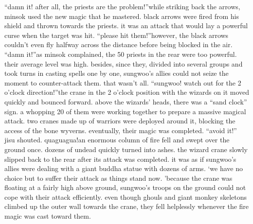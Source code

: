 “damn it! after all, the priests are the problem!”while striking back the arrows, minsok used the new magic that he mastered.
 black arrows were fired from his shield and thrown towards the priests.
 it was an attack that would lay a powerful curse when the target was hit.
“please hit them!”however, the black arrows couldn’t even fly halfway across the distance before being blocked in the air.
“damn it!”as minsok complained, the 50 priests in the rear were too powerful.
 their average level was high.
 besides, since they, divided into several groups and took turns in casting spells one by one, sungwoo’s allies could not seize the moment to counter-attack them.
that wasn’t all.
“sungwoo! watch out for the 2 o’clock direction!”the crane in the 2 o’clock position with the wizards on it moved quickly and bounced forward.
 above the wizards’ heads, there was a “sand clock” sign.
 a whopping 20 of them were working together to prepare a massive magical attack.
two cranes made up of warriors were deployed around it, blocking the access of the bone wyverns.
 eventually, their magic was completed.
“avoid it!” jisu shouted.
quaguagua!an enormous column of fire fell and swept over the ground once.
 dozens of undead quickly turned into ashes.
the wizard crane slowly slipped back to the rear after its attack was completed.
it was as if sungwoo’s allies were dealing with a giant buddha statue with dozens of arms.
‘we have no choice but to suffer their attack as things stand now.
’because the crane was floating at a fairly high above ground, sungwoo’s troops on the ground could not cope with their attack efficiently.
even though ghouls and giant monkey skeletons climbed up the outer wall towards the crane, they fell helplessly whenever the fire magic was cast toward them.

